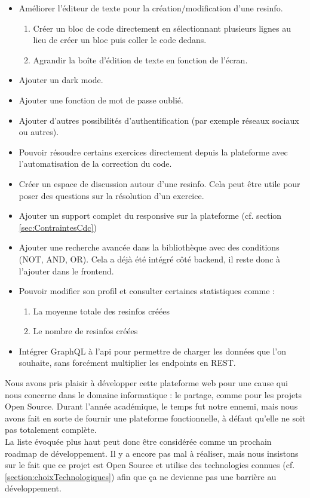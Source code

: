 \begin{itemize}
    \item Améliorer l'éditeur de texte pour la création/modification d'une \gls{resinfo}.
    \begin{enumerate}
        \item Créer un bloc de code directement en sélectionnant plusieurs lignes au lieu de créer un bloc puis coller le code dedans.
        \item Agrandir la boîte d'édition de texte en fonction de l'écran.
    \end{enumerate}
    \item Ajouter un dark mode.
    \item Ajouter une fonction de mot de passe oublié.
    \item Ajouter d'autres possibilités d'authentification (par exemple réseaux sociaux ou autres).
    \item Pouvoir résoudre certains exercices directement depuis la plateforme avec l'automatisation de la correction du code.
    \item Créer un espace de discussion autour d'une \gls{resinfo}. Cela peut être utile pour poser des questions sur la résolution d'un exercice.
    \item Ajouter un support complet du responsive sur la plateforme (cf. section \ref{sec:ContraintesCdc})
    \item Ajouter une recherche avancée dans la bibliothèque avec des conditions (NOT, AND, OR). Cela a déjà été intégré côté \gls{backend}, il reste donc à l'ajouter dans le \gls{frontend}.
    \item Pouvoir modifier son profil et consulter certaines statistiques comme :
    \begin{enumerate}
        \item La moyenne totale des \glspl{resinfo} créées
        \item Le nombre de \glspl{resinfo} créées
    \end{enumerate}
    \item Intégrer GraphQL à l'\gls{api} pour permettre de charger les données que l'on souhaite, sans forcément multiplier les endpoints en REST.
\end{itemize}

Nous avons pris plaisir à développer cette plateforme web pour une cause qui nous concerne dans le domaine informatique : le partage, comme pour les projets Open Source. Durant l'année académique, le temps fut notre ennemi, mais nous avons fait en sorte de fournir une plateforme fonctionnelle, à défaut qu'elle ne soit pas totalement complète.\\

La liste évoquée plus haut peut donc être considérée comme un prochain roadmap de développement. Il y a encore pas mal à réaliser, mais nous insistons sur le fait que ce projet est Open Source et utilise des technologies connues (cf. \ref{section:choixTechnologiques}) afin que ça ne devienne pas une barrière au développement.